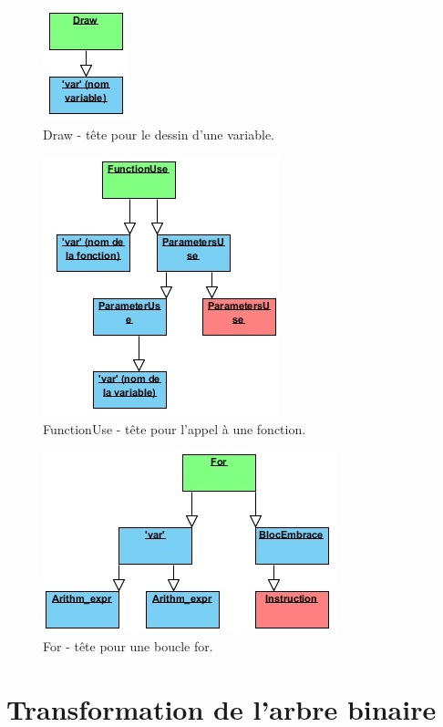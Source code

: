\documentclass[11pt]{report} %
\begin{document}
\begin{figure}[h]
    \centering
    \includegraphics[scale=1]{img/draw.jpg}
    \caption{\label{CG} Draw - tête pour le dessin d'une variable.}
\end{figure}
\begin{figure}[h]
    \centering
    \includegraphics[scale=1]{img/fonctionuse.jpg}
    \caption{\label{CG} FunctionUse - tête pour l'appel à une fonction.}
\end{figure}
\begin{figure}[h]
    \centering
    \includegraphics[scale=1]{img/for.jpg}
    \caption{\label{CG} For - tête pour une boucle for.}
\end{figure}




\chapter{Transformation de l'arbre binaire}
\end{document}
